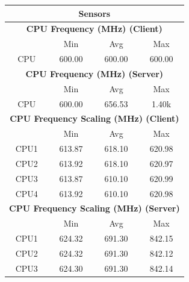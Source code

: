 \documentclass[11pt,a4paper]{scrreprt}
\begin{document}
\begin{table}[H]
\centering
    \begin{tabular}{||c|c|c|c|c|c|c||}
    \hline
    \multicolumn{7}{|c|}{\textbf{Sensors}} \\
    \hline
    \multicolumn{7}{|c|}{\textbf{CPU Frequency (MHz) (Client)}} \\
    \hline\hline
      & \multicolumn{2}{|c|}{Min} & \multicolumn{2}{|c|}{Avg} & \multicolumn{2}{|c|}{Max} \\
    \hline
    CPU & \multicolumn{2}{|c|}{600.00} & \multicolumn{2}{|c|}{600.00} & \multicolumn{2}{|c|}{600.00} \\
    \hline\hline
    \multicolumn{7}{|c|}{\textbf{CPU Frequency (MHz) (Server)}} \\
    \hline\hline
      & \multicolumn{2}{|c|}{Min} & \multicolumn{2}{|c|}{Avg} & \multicolumn{2}{|c|}{Max} \\
    \hline
    CPU & \multicolumn{2}{|c|}{600.00} & \multicolumn{2}{|c|}{656.53} & \multicolumn{2}{|c|}{1.40k} \\
    \hline\hline
    \multicolumn{7}{|c|}{\textbf{CPU Frequency Scaling (MHz) (Client)}} \\
    \hline
      & \multicolumn{2}{|c|}{Min} & \multicolumn{2}{|c|}{Avg} & \multicolumn{2}{|c|}{Max} \\
    \hline
    CPU1 & \multicolumn{2}{|c|}{613.87} & \multicolumn{2}{|c|}{618.10} & \multicolumn{2}{|c|}{620.98} \\
    \hline
    CPU2 & \multicolumn{2}{|c|}{613.92} & \multicolumn{2}{|c|}{618.10} & \multicolumn{2}{|c|}{620.97} \\
    \hline
    CPU3 & \multicolumn{2}{|c|}{613.87} & \multicolumn{2}{|c|}{610.10} & \multicolumn{2}{|c|}{620.99} \\
    \hline
    CPU4 & \multicolumn{2}{|c|}{613.92} & \multicolumn{2}{|c|}{610.10} & \multicolumn{2}{|c|}{620.98} \\
    \hline\hline
    \multicolumn{7}{|c|}{\textbf{CPU Frequency Scaling (MHz) (Server)}} \\
    \hline
      & \multicolumn{2}{|c|}{Min} & \multicolumn{2}{|c|}{Avg} & \multicolumn{2}{|c|}{Max} \\
    \hline
    CPU1 & \multicolumn{2}{|c|}{624.32} & \multicolumn{2}{|c|}{691.30} & \multicolumn{2}{|c|}{842.15} \\
    \hline
    CPU2 & \multicolumn{2}{|c|}{624.32} & \multicolumn{2}{|c|}{691.30} & \multicolumn{2}{|c|}{842.12} \\
    \hline
    CPU3 & \multicolumn{2}{|c|}{624.30} & \multicolumn{2}{|c|}{691.30} & \multicolumn{2}{|c|}{842.14} \\

\end{tabular}
\end{table}
\end{document}
